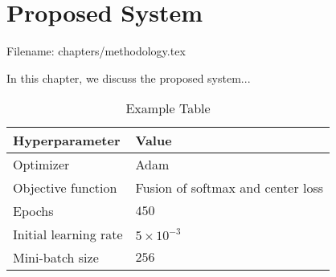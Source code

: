 \chapter{Proposed  System} \label{ch:methodology}
Filename: chapters/methodology.tex

In this chapter, we discuss the proposed system...  


\begin{table}
	\centering
	\caption{Example Table \label{table:summary_tn}}
	\begin{tabular*}{32pc}{@{\extracolsep{\fill}}ll@{}}
		\hline \noalign{\vspace{3pt}}
		\textbf{Hyperparameter} &\qquad \textbf{Value} \\ [3pt] \hline\noalign{\vspace{3pt}}
		Optimizer     			&\qquad Adam~\cite{Kingma_15} \\[3pt]
		Objective function  	&\qquad Fusion of softmax and center loss \\[3pt]
		Epochs        			&\qquad $ 450 $ \\ [3pt]
		Initial learning rate	&\qquad $5 \times 10^{-3}$  \\[3pt]
		Mini-batch size			&\qquad $ 256 $ \\
		\hline
	\end{tabular*}
\end{table}

